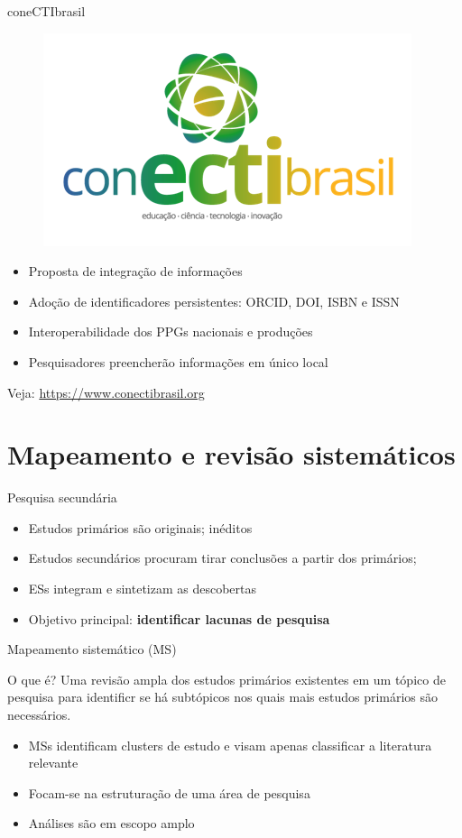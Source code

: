 \begin{frame}{coneCTIbrasil}
\begin{figure}
\centering
\includegraphics[scale=0.3]{figs/02/conecti}
\end{figure}
\begin{itemize}
\item Proposta de integração de informações
\item Adoção de identificadores persistentes: ORCID, DOI, ISBN e ISSN
\item Interoperabilidade dos PPGs nacionais e produções
\item Pesquisadores preencherão informações em único local
\end{itemize}
Veja: \url{https://www.conectibrasil.org}
\end{frame}

\section{Mapeamento e revisão sistemáticos}

\begin{frame}{Pesquisa secundária}
\begin{itemize}
\item Estudos primários são originais; inéditos
\item Estudos secundários procuram tirar conclusões a partir dos primários;
\item ESs integram e sintetizam as descobertas 
\item Objetivo principal: \textbf{identificar lacunas de pesquisa}
\end{itemize}
\end{frame}

\begin{frame}{Mapeamento sistemático (MS)}
\begin{block}{O que é?}
Uma revisão ampla dos estudos primários existentes em um tópico de pesquisa para identificr se há subtópicos nos quais mais estudos primários são necessários.
\end{block}
\begin{itemize}
\item MSs identificam clusters de estudo e visam apenas classificar a literatura relevante 
\item Focam-se na estruturação de uma área de pesquisa
\item Análises são em escopo amplo
\end{itemize}
\end{frame}

